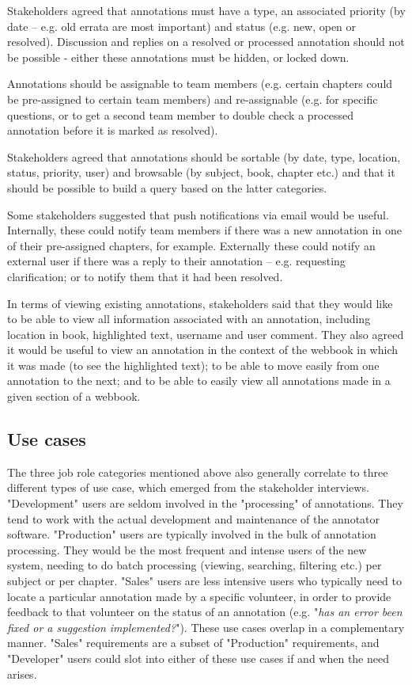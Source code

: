 Stakeholders agreed that annotations must have a type, an associated priority (by date – e.g. old errata are most important) and status (e.g. new, open or resolved). Discussion and replies on a resolved or processed annotation should not be possible - either these annotations must be hidden, or locked down. 

Annotations should be assignable to team members (e.g. certain chapters could be pre-assigned to certain team members) and re-assignable (e.g. for specific questions, or to get a second team member to double check a processed annotation before it is marked as resolved).

Stakeholders agreed that annotations should be sortable (by date, type, location, status, priority, user) and browsable (by subject, book, chapter etc.) and that it should be possible to build a query based on the latter categories.

Some stakeholders suggested that push notifications via email would be useful. Internally, these could notify team members if there was a new annotation in one of their pre-assigned chapters, for example. Externally these could notify an external user if there was a reply to their annotation – e.g. requesting clarification; or to notify them that it had been resolved.

In terms of viewing existing annotations, stakeholders said that they would like to be able to view all information associated with an annotation, including location in book, highlighted text, username and user comment. They also agreed it would be useful to view an annotation in the context of the webbook in which it was made (to see the highlighted text); to be able to move easily from one annotation to the next; and to be able to easily view all annotations made in a given section of a webbook.

\subsection{Use cases}
The three job role categories mentioned above also generally correlate to three different types of use case, which emerged from the stakeholder interviews. "Development" users are seldom involved in the "processing" of annotations. They tend to work with the actual development and maintenance of the annotator software. "Production" users are typically involved in the bulk of annotation processing. They would be the most frequent and intense users of the new system, needing to do batch processing (viewing, searching, filtering etc.) per subject or per chapter. "Sales" users are less intensive users who typically need to locate a particular annotation made  by a specific volunteer, in order to provide feedback to that volunteer on the status of an annotation (e.g. "\textit{has an error been fixed or a suggestion implemented?}"). These use cases overlap in a complementary manner. "Sales" requirements are a subset of "Production" requirements, and "Developer" users could slot into either of these use cases if and when the need arises. 

